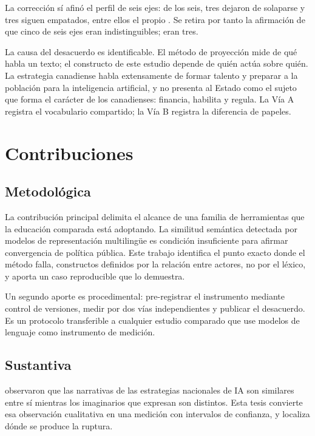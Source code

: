 La corrección sí afinó el perfil de seis ejes: de los seis, tres dejaron de solaparse y tres siguen empatados, entre ellos el propio \dezhi. Se retira por tanto la afirmación de que cinco de seis ejes eran indistinguibles; eran tres.

La causa del desacuerdo es identificable. El método de proyección mide de qué habla un texto; el constructo de este estudio depende de quién actúa sobre quién. La estrategia canadiense habla extensamente de formar talento y preparar a la población para la inteligencia artificial, y no presenta al Estado como el sujeto que forma el carácter de los canadienses: financia, habilita y regula. La Vía A registra el vocabulario compartido; la Vía B registra la diferencia de papeles.

\section{Contribuciones}

\subsection{Metodológica}

La contribución principal delimita el alcance de una familia de herramientas que la educación comparada está adoptando. La similitud semántica detectada por modelos de representación multilingüe es condición insuficiente para afirmar convergencia de política pública. Este trabajo identifica el punto exacto donde el método falla, constructos definidos por la relación entre actores, no por el léxico, y aporta un caso reproducible que lo demuestra.

Un segundo aporte es procedimental: pre-registrar el instrumento mediante control de versiones, medir por dos vías independientes y publicar el desacuerdo. Es un protocolo transferible a cualquier estudio comparado que use modelos de lenguaje como instrumento de medición.

\subsection{Sustantiva}

\citet{bareis2022talking} observaron que las narrativas de las estrategias nacionales de IA son similares entre sí mientras los imaginarios que expresan son distintos. Esta tesis convierte esa observación cualitativa en una medición con intervalos de confianza, y localiza dónde se produce la ruptura.

